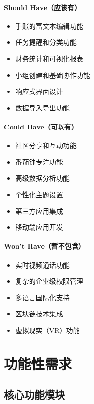 \documentclass[a4paper]{article}
\begin{document}
\paragraph{Should Have（应该有）}
\begin{itemize}
    \item 手账的富文本编辑功能
    \item 任务提醒和分类功能
    \item 财务统计和可视化报表
    \item 小组创建和基础协作功能
    \item 响应式界面设计
    \item 数据导入导出功能
\end{itemize}

\paragraph{Could Have（可以有）}
\begin{itemize}
    \item 社区分享和互动功能
    \item 番茄钟专注功能
    \item 高级数据分析功能
    \item 个性化主题设置
    \item 第三方应用集成
    \item 移动端应用开发
\end{itemize}

\paragraph{Won't Have（暂不包含）}
\begin{itemize}
    \item 实时视频通话功能
    \item 复杂的企业级权限管理
    \item 多语言国际化支持
    \item 区块链技术集成
    \item 虚拟现实（VR）功能
\end{itemize}

\section{功能性需求}

\subsection{核心功能模块}
\end{document}

